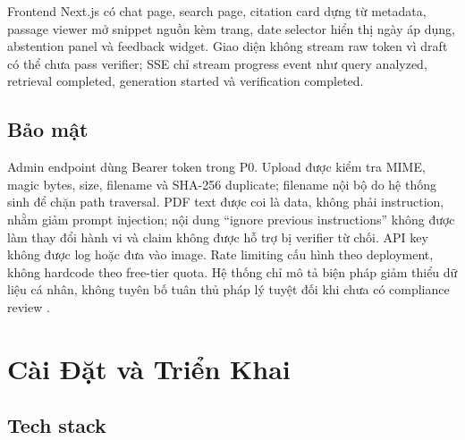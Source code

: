 \documentclass[a4paper,12pt]{extreport}
\begin{document}
Frontend Next.js có chat page, search page, citation card dựng từ metadata, passage viewer mở snippet nguồn kèm trang, date selector hiển thị ngày áp dụng, abstention panel và feedback widget. Giao diện không stream raw token vì draft có thể chưa pass verifier; SSE chỉ stream progress event như query analyzed, retrieval completed, generation started và verification completed.

\section{Bảo mật}

Admin endpoint dùng Bearer token trong P0. Upload được kiểm tra MIME, magic bytes, size, filename và SHA-256 duplicate; filename nội bộ do hệ thống sinh để chặn path traversal. PDF text được coi là data, không phải instruction, nhằm giảm prompt injection; nội dung ``ignore previous instructions'' không được làm thay đổi hành vi và claim không được hỗ trợ bị verifier từ chối. API key không được log hoặc đưa vào image. Rate limiting cấu hình theo deployment, không hardcode theo free-tier quota. Hệ thống chỉ mô tả biện pháp giảm thiểu dữ liệu cá nhân, không tuyên bố tuân thủ pháp lý tuyệt đối khi chưa có compliance review \cite{luat91_2025,nghidinh356_2025}.

\chapter{Cài Đặt và Triển Khai}

\section{Tech stack}
\end{document}
